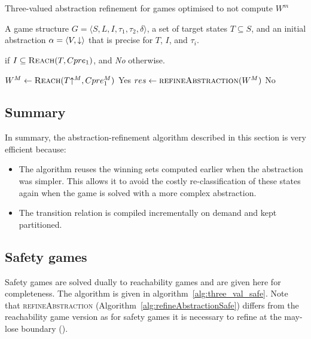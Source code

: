 \begin{algorithm}
\caption{Three-valued abstraction refinement for games optimised to not compute $W^m$}
\label{alg:opt_three_val_reach}

\begin{algorithmic}[1]

\Require A game structure $G = \langle S, L, I, \tau_1, \tau_2, \delta \rangle$, a set 
of target states $T\subseteq S$, and an initial abstraction $\alpha=\langle V, \mathord{\downarrow} \rangle$
that is precise for $T$, $I$, and $\tau_i$.

 if $I \subseteq \textsc{Reach}(T, Cpre_1)$, and {\it No} otherwise.


    \Loop
        \State $W^M \gets \textsc{Reach}(T\mathord{\uparrow^M}, Cpre_1^M)$
            \State\Return Yes
        \Else       
            \State $res \gets \Call{refineAbstraction}{W^M}$
                \State\Return No
            \EndIf
        \EndIf
    \EndLoop
\EndFunction

\end{algorithmic}
\end{algorithm}

\subsection{Summary}

In summary, the abstraction-refinement algorithm described in this section is very efficient because:
\begin{itemize}
    \item The algorithm reuses the winning sets computed earlier when the abstraction was simpler. This allows it to avoid the costly re-classification of these states again when the game is solved with a more complex abstraction.
    \item The transition relation is compiled incrementally on demand and kept partitioned. 
\end{itemize}

\subsection{Safety games}

Safety games are solved dually to reachability games and are given here for completeness. The algorithm is given in algorithm~\ref{alg:three_val_safe}. Note that \textsc{refineAbstraction} (Algorithm~\ref{alg:refineAbstractionSafe}) differs from the reachability game version as for safety games it is necessary to refine at the may-lose boundary (\cite{Alfaro_Roy_07}).

